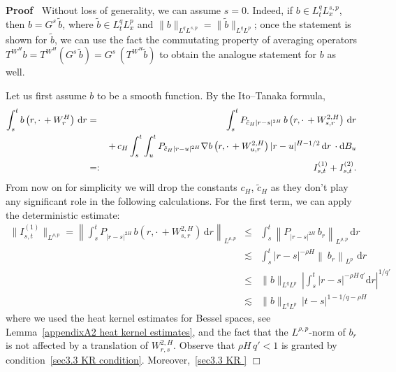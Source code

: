 \documentclass[10pt]{article}
\newcommand{\mathd}{\mathrm{d}}
\newcommand{\tmcolor}[2]{{\color{#1}{#2}}}
\newenvironment{proof}{\noindent\textbf{Proof\ }}{\hspace*{\fill}$\Box$\medskip}
\begin{document}
\begin{proof}
  Without loss of generality, we can assume $s = 0$. Indeed, if $b \in L^q_t
  L^{s, p}_x$, then $b = G^s \, \tilde{b}$, where $\tilde{b} \in L^q_t L^p_x$
  and $\| b \|_{L^q L^{s, p}} = \| \tilde{b} \|_{L^q L^p}$; once the statement
  is shown for $\tilde{b}$, we can use the fact the commutating property of
  averaging operators $T^{W^H} b = T^{W^H} \left( G^s \, \tilde{b} \right) =
  G^s \, (T^{W^H} \tilde{b})$ to obtain the analogue statement for $b$ as
  well.
  
  Let us first assume $b$ to be a smooth function. By the Ito--Tanaka formula,
  \begin{eqnarray*}
    \int_s^t b \left( r, \cdot \, + W^H_r \right) \, \mathd r & = &
    \tmcolor{black}{\int_s^t P_{\tilde{c}_H | r - s |^{2 H}} \, b \left( r,
    \cdot \, + W^{2, H}_{s, r} \right) \, \mathd r}\\
    &  & + \, c_H \int_s^t \int_u^t P_{\tilde{c}_H | r - u |^{2 H}} \nabla b
    \left( r, \cdot \, + W^{2, H}_{u, r} \right) | r - u |^{H - 1 / 2} \,
    \mathd r \, \cdot \mathd B_u\\
    & = : & I^{(1)}_{s, t} + I_{s, t}^{(2)} .
  \end{eqnarray*}
  From now on for simplicity we will drop the constants $c_H$, $\tilde{c}_H$
  as they don't play any significant role in the following calculations. For
  the first term, we can apply the deterministic estimate:
  \begin{eqnarray*}
    \| I_{s, t}^{(1)} \|_{L^{\rho, p}} = \left\| \int_s^t P_{| r - s |^{2 H}}
    \, b \left( r, \cdot \, + W^{2, H}_{s, r} \right) \, \mathd r
    \right\|_{L^{\rho, p}} & \leqslant & \int_s^t \left\| P_{| r - s |^{2 H}}
    \, b_r \right\|_{L^{\rho, p}} \, \mathd r\\
    & \lesssim & \int_s^t | r - s |^{- \rho H} \left\|_{} \, b_r
    \right\|_{L^p} \, \, \mathd r\\
    & \leqslant & \| b \|_{L^q L^p} \, \left| \int_s^t | r - s |^{- \rho H \,
    q'} \mathd r \right|^{1 / q'}\\
    & \lesssim & \| b \|_{L^q L^p} \, | t - s |^{1 - 1 / q - \rho H}
  \end{eqnarray*}
  where we used the heat kernel estimates for Bessel spaces, see
  Lemma~\ref{appendixA2 heat kernel estimates}, and the fact that the
  $L^{\rho, p}$\mbox{-}norm of $b_r$ is not affected by a translation of
  $W^{2, H}_{r, s}$. Observe that $\rho H \, q' < 1$ is granted by
  condition~{\eqref{sec3.3 KR condition}}. Moreover,~{\eqref{sec3.3 KR
}}
\end{proof}
\end{document}
